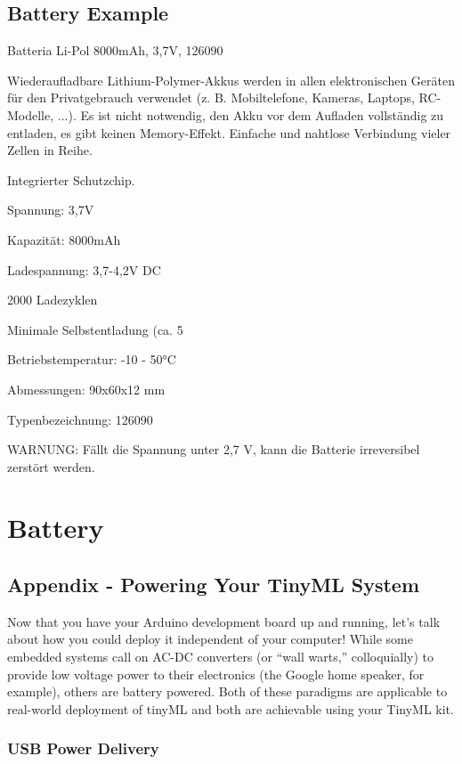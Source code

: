 \section{Battery Example}


Batteria Li-Pol 8000mAh, 3,7V, 126090

Wiederaufladbare Lithium-Polymer-Akkus werden in allen elektronischen Geräten für den Privatgebrauch verwendet (z. B. Mobiltelefone, Kameras, Laptops, RC-Modelle, ...). Es ist nicht notwendig, den Akku vor dem Aufladen vollständig zu entladen, es gibt keinen Memory-Effekt. Einfache und nahtlose Verbindung vieler Zellen in Reihe.

\bigskip


Integrierter Schutzchip.

Spannung: 3,7V

Kapazität: 8000mAh

Ladespannung: 3,7-4,2V DC

2000 Ladezyklen

Minimale Selbstentladung (ca. 5%

Betriebstemperatur: -10 - 50°C

Abmessungen: 90x60x12 mm

Typenbezeichnung: 126090

WARNUNG: Fällt die Spannung unter 2,7 V, kann die Batterie irreversibel zerstört werden. 
    
    
\chapter{Battery}

\section{Appendix - Powering Your TinyML System}

Now that you have your Arduino development board up and running, let's talk about how you could deploy it independent of your computer! While some embedded systems call on AC-DC converters (or “wall warts,” colloquially) to provide low voltage power to their electronics (the Google home speaker, for example), others are battery powered. Both of these paradigms are applicable to real-world deployment of tinyML and both are achievable using your TinyML kit.

\subsection{USB Power Delivery}

